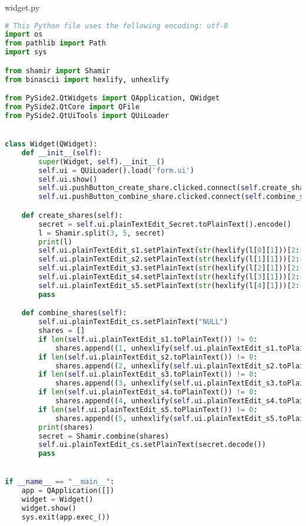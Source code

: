 \newpage
widget.py
\begin{lstlisting}[language = Python]
# This Python file uses the following encoding: utf-8
import os
from pathlib import Path
import sys

from shamir import Shamir
from binascii import hexlify, unhexlify

from PySide2.QtWidgets import QApplication, QWidget
from PySide2.QtCore import QFile
from PySide2.QtUiTools import QUiLoader


class Widget(QWidget):
    def __init__(self):
        super(Widget, self).__init__()
        self.ui = QUiLoader().load('form.ui')
        self.ui.show()
        self.ui.pushButton_create_share.clicked.connect(self.create_shares)
        self.ui.pushButton_combine_share.clicked.connect(self.combine_shares)

    def create_shares(self):
        secret = self.ui.plainTextEdit_Secret.toPlainText().encode()
        l = Shamir.split(3, 5, secret)
        print(l)
        self.ui.plainTextEdit_s1.setPlainText(str(hexlify(l[0][1]))[2:-1])
        self.ui.plainTextEdit_s2.setPlainText(str(hexlify(l[1][1]))[2:-1])
        self.ui.plainTextEdit_s3.setPlainText(str(hexlify(l[2][1]))[2:-1])
        self.ui.plainTextEdit_s4.setPlainText(str(hexlify(l[3][1]))[2:-1])
        self.ui.plainTextEdit_s5.setPlainText(str(hexlify(l[4][1]))[2:-1])
        pass

    def combine_shares(self):
        self.ui.plainTextEdit_cs.setPlainText("NULL")
        shares = []
        if len(self.ui.plainTextEdit_s1.toPlainText()) != 0:
            shares.append((1, unhexlify(self.ui.plainTextEdit_s1.toPlainText().encode())))
        if len(self.ui.plainTextEdit_s2.toPlainText()) != 0:
            shares.append((2, unhexlify(self.ui.plainTextEdit_s2.toPlainText().encode())))
        if len(self.ui.plainTextEdit_s3.toPlainText()) != 0:
            shares.append((3, unhexlify(self.ui.plainTextEdit_s3.toPlainText().encode())))
        if len(self.ui.plainTextEdit_s4.toPlainText()) != 0:
            shares.append((4, unhexlify(self.ui.plainTextEdit_s4.toPlainText().encode())))
        if len(self.ui.plainTextEdit_s5.toPlainText()) != 0:
            shares.append((5, unhexlify(self.ui.plainTextEdit_s5.toPlainText().encode())))
        print(shares)
        secret = Shamir.combine(shares)
        self.ui.plainTextEdit_cs.setPlainText(secret.decode())
        pass


if __name__ == "__main__":
    app = QApplication([])
    widget = Widget()
    widget.show()
    sys.exit(app.exec_())
\end{lstlisting}

